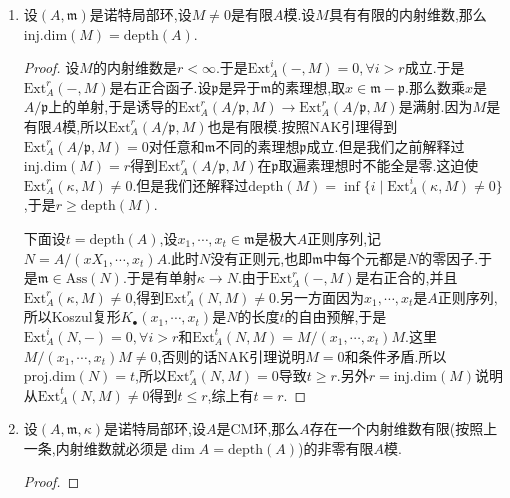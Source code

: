 \begin{enumerate}
\begin{proof}
    	按照定义,$A$是Gorenstein环当且仅当对每个素理想$\mathfrak{p}$有$A_{\mathfrak{p}}$是Gorenstein环.当且仅当对每个素理想$\mathfrak{p}$有:
    	$$\mathrm{Ext}_{A_{\mathfrak{p}}}^i(\kappa(\mathfrak{p}),A_{\mathfrak{p}})\cong\mathrm{Ext}_A^i(\kappa(\mathfrak{p}),A)_{\mathfrak{p}}=\left\{\begin{array}{cc}0&i\not=\mathrm{ht}(\mathfrak{p})\\\kappa(\mathfrak{p})&i=\mathrm{ht}(\mathfrak{p})\end{array}\right.$$
    	
    	按照上一条,这等价于讲$\mu_i(\mathfrak{p},A)=\delta_{i,\mathrm{ht}(\mathfrak{p})}$.
    \end{proof}
    \item 设$(A,\mathfrak{m})$是诺特局部环,设$M\not=0$是有限$A$模.设$M$具有有限的内射维数,那么$\mathrm{inj.dim}(M)=\mathrm{depth}(A)$.
    \begin{proof}
    	
    	设$M$的内射维数是$r<\infty$.于是$\mathrm{Ext}_A^i(-,M)=0,\forall i>r$成立.于是$\mathrm{Ext}_A^r(-,M)$是右正合函子.设$\mathfrak{p}$是异于$\mathfrak{m}$的素理想,取$x\in\mathfrak{m}-\mathfrak{p}$.那么数乘$x$是$A/\mathfrak{p}$上的单射,于是诱导的$\mathrm{Ext}_A^r(A/\mathfrak{p},M)\to\mathrm{Ext}_A^r(A/\mathfrak{p},M)$是满射.因为$M$是有限$A$模,所以$\mathrm{Ext}_A^r(A/\mathfrak{p},M)$也是有限模.按照NAK引理得到$\mathrm{Ext}_A^r(A/\mathfrak{p},M)=0$对任意和$\mathfrak{m}$不同的素理想$\mathfrak{p}$成立.但是我们之前解释过$\mathrm{inj.dim}(M)=r$得到$\mathrm{Ext}_A^r(A/\mathfrak{p},M)$在$\mathfrak{p}$取遍素理想时不能全是零.这迫使$\mathrm{Ext}_A^r(\kappa,M)\not=0$.但是我们还解释过$\mathrm{depth}(M)=\inf\{i\mid\mathrm{Ext}_A^i(\kappa,M)\not=0\}$,于是$r\ge\mathrm{depth}(M)$.
    	
    	\qquad
    	
    	下面设$t=\mathrm{depth}(A)$,设$x_1,\cdots,x_t\in\mathfrak{m}$是极大$A$正则序列,记$N=A/(xX_1,\cdots,x_t)A$.此时$N$没有正则元,也即$\mathfrak{m}$中每个元都是$N$的零因子.于是$\mathfrak{m}\in\mathrm{Ass}(N)$.于是有单射$\kappa\to N$.由于$\mathrm{Ext}_A^r(-,M)$是右正合的,并且$\mathrm{Ext}_A^r(\kappa,M)\not=0$,得到$\mathrm{Ext}_A^r(N,M)\not=0$.另一方面因为$x_1,\cdots,x_t$是$A$正则序列,所以Koszul复形$K_{\bullet}(x_1,\cdots,x_t)$是$N$的长度$t$的自由预解,于是$\mathrm{Ext}_A^i(N,-)=0,\forall i>r$和$\mathrm{Ext}_A^t(N,M)=M/(x_1,\cdots,x_t)M$.这里$M/(x_1,\cdots,x_t)M\not=0$,否则的话NAK引理说明$M=0$和条件矛盾.所以$\mathrm{proj.dim}(N)=t$,所以$\mathrm{Ext}_A^r(N,M)=0$导致$t\ge r$.另外$r=\mathrm{inj.dim}(M)$说明从$\mathrm{Ext}_A^t(N,M)\not=0$得到$t\le r$,综上有$t=r$.
    \end{proof}
    \item 设$(A,\mathfrak{m},\kappa)$是诺特局部环,设$A$是CM环,那么$A$存在一个内射维数有限(按照上一条,内射维数就必须是$\dim A=\mathrm{depth}(A)$)的非零有限$A$模.
    \begin{proof}
    	

\end{proof}
\end{enumerate}
